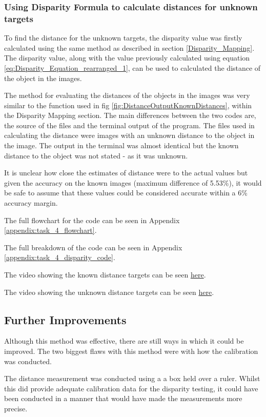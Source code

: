 \documentclass[conference]{IEEEtran}
\begin{document}
\subsubsection{Using Disparity Formula to calculate distances for unknown targets} 
To find the distance for the unknown targets, the disparity value was firstly calculated using the same method as described in section \ref{Disparity_Mapping}. The disparity value, along with the value previously calculated using equation \ref{eq:Disparity_Equation_rearranged_1}, can be used to calculated the distance of the object in the images. 

The method for evaluating the distances of the objects in the images was very similar to the function used in fig \ref{fig:DistanceOutputKnownDistances}, within the Disparity Mapping section. The main differences between the two codes are, the source of the files and the terminal output of the program. The files used in calculating the distance were images with an unknown distance to the object in the image. The output in the terminal was almost identical but the known distance to the object was not stated - as it was unknown. 

It is unclear how close the estimates of distance were to the actual values but given the accuracy on the known images (maximum difference of 5.53\%), it would be safe to assume that these values could be considered accurate within a 6\% accuracy margin.

The full flowchart for the code can be seen in Appendix \ref{appendix:task_4_flowchart}.

The full breakdown of the code can be seen in Appendix \ref{appendix:task_4_disparity_code}.

The video showing the known distance targets can be seen \href{https://youtu.be/jV-Ht9x28nk}{here}.

The video showing the unknown distance targets can be seen \href{https://youtu.be/g0bPXUbjqvo}{here}.

\subsection{Further Improvements}

Although this method was effective, there are still ways in which it could be improved. The two biggest flaws with this method were with how the calibration was conducted.

The distance measurement was conducted using a a box held over a ruler. Whilst this did provide adequate calibration data for the disparity testing, it could have been conducted in a manner that would have made the measurements more precise. 
\end{document}
